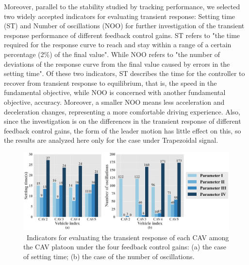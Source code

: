 \documentclass[a4paper]{cas-sc}
\begin{document}
Moreover, parallel to the stability studied by tracking performance, we selected two widely accepted indicators for evaluating transient response: Setting time (ST) and Number of oscillations (NOO) for further investigation of the transient response performance of different feedback control gains. ST refers to "the time required for the response curve to reach and stay within a range of a certain percentage (2\%) of the final value". While NOO refers to "the number of deviations of the response curve from the final value caused by errors in the setting time". Of these two indicators, ST describes the time for the controller to recover from transient response to equilibrium, that is, the speed in the fundamental objective, while NOO is concerned with another fundamental objective, accuracy. Moreover, a smaller NOO means less acceleration and deceleration changes, representing a more comfortable driving experience. Also, since the investigation is on the differences in the transient response of different feedback control gains, the form of the leader motion has little effect on this, so the results are analyzed here only for the case under Trapezoidal signal.

\begin{figure}

  \centering
  \includegraphics[width=14cm]{figs/fig6.png}
  \caption{~Indicators for evaluating the transient response of each CAV among the CAV platoon under the four feedback control gains: (a) the case of setting time; (b) the case of the number of oscillations.}
  \label{fig6}
\end{figure}
\end{document}
